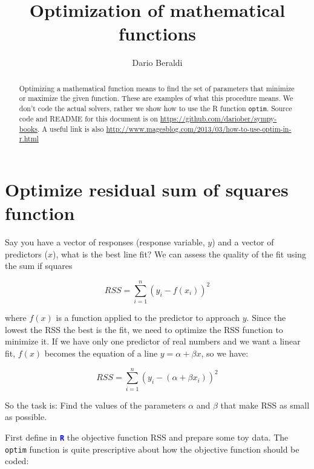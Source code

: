 \documentclass[a4paper]{article}
\newcommand{\R}{\textbf{\texttt{\textcolor{Blue}{R}} }}
\begin{document}
\title{Optimization of mathematical functions}

\author{Dario Beraldi}
\maketitle
\tableofcontents

\begin{abstract}
\noindent Optimizing a mathematical function means to find the set of parameters that
minimize or maximize the given function. These are examples of what this procedure means.
We don't code the actual solvers, rather we show how to use the R function \texttt{optim}.
Source code and README for this document is on \href{https://github.com/dariober/sympy-books}{https://github.com/dariober/sympy-books}.
A useful link is also \href{http://www.magesblog.com/2013/03/how-to-use-optim-in-r.html}{http://www.magesblog.com/2013/03/how-to-use-optim-in-r.html}
\end{abstract}



\section{Optimize residual sum of squares function}

Say you have a vector of responses (response variable, $y$) and a vector of predictors ($x$),
what is the best line fit? We can assess the quality of the fit using the sum if squares

$$
RSS= \sum_{i= 1}^{n}(y_i - f(x_i))^2
$$

where $f(x)$ is a function applied to the predictor to approach $y$. Since the lowest the RSS the best is the fit, we need
to optimize the RSS function to minimize it. If we have only one predictor of real numbers and we want a linear fit,
$f(x)$ becomes the equation of a line $y= \alpha + \beta x$, so we have:

$$
RSS= \sum_{i= 1}^{n}(y_i - (\alpha + \beta x_i))^2
$$

So the task is: Find the values of the parameters $\alpha$ and $\beta$ that make RSS as small as possible.

First define in \R the objective function RSS and prepare some toy data.
The \texttt{optim} function is quite prescriptive about how the objective function should be coded:
\end{document}
